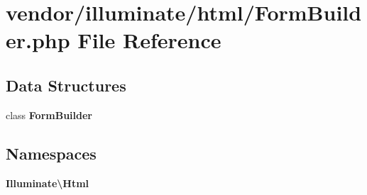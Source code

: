 \section{vendor/illuminate/html/\+Form\+Builder.php File Reference}
\label{_form_builder_8php}
\subsection*{Data Structures}
\begin{DoxyCompactItemize}
\item 
class {\bf Form\+Builder}
\end{DoxyCompactItemize}
\subsection*{Namespaces}
\begin{DoxyCompactItemize}
\item 
 {\bf Illuminate\textbackslash{}\+Html}
\end{DoxyCompactItemize}
